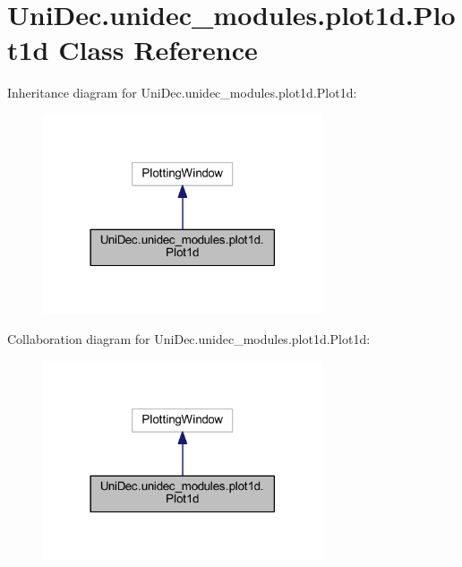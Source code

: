 \hypertarget{class_uni_dec_1_1unidec__modules_1_1plot1d_1_1_plot1d}{}\section{Uni\+Dec.\+unidec\+\_\+modules.\+plot1d.\+Plot1d Class Reference}
\label{class_uni_dec_1_1unidec__modules_1_1plot1d_1_1_plot1d}


Inheritance diagram for Uni\+Dec.\+unidec\+\_\+modules.\+plot1d.\+Plot1d\+:\nopagebreak
\begin{figure}[H]
\begin{center}
\leavevmode
\includegraphics[width=234pt]{class_uni_dec_1_1unidec__modules_1_1plot1d_1_1_plot1d__inherit__graph}
\end{center}
\end{figure}


Collaboration diagram for Uni\+Dec.\+unidec\+\_\+modules.\+plot1d.\+Plot1d\+:\nopagebreak
\begin{figure}[H]
\begin{center}
\leavevmode
\includegraphics[width=234pt]{class_uni_dec_1_1unidec__modules_1_1plot1d_1_1_plot1d__coll__graph}
\end{center}
\end{figure}
